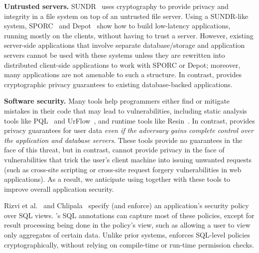 
{\bf Untrusted servers.}
SUNDR~\cite{li:sundr} uses cryptography to provide privacy and
integrity in a file system on top of an untrusted file server.  Using
a SUNDR-like system, SPORC~\cite{feldman:sporc} and
Depot~\cite{mahajan:depot} show how to build low-latency applications,
running mostly on the clients, without having to trust a server.
However, existing server-side applications that involve separate
database/storage and application servers cannot be used with these
systems unless they are rewritten into distributed client-side
applications to work with SPORC or Depot; moreover, many applications
are not amenable to such a structure.
In contrast, \name{} provides cryptographic privacy guarantees to
existing database-backed applications.



{\bf Software security.}  Many tools help programmers either find or
mitigate mistakes in their code that may lead to vulnerabilities,
including static analysis tools like PQL~\cite{livshits:javasec, martin:pql} and
UrFlow~\cite{chlipala:urflow}, and runtime tools like
Resin~\cite{yip:resin}.
In contrast, \name{} provides privacy guarantees for user data
\textit{even if the adversary gains complete control over the
  application and database servers}.  These tools provide no
guarantees in the face of this threat, but in contrast, \name cannot
provide privacy in the face of vulnerabilities that trick the user's
client machine into issuing unwanted requests (such as cross-site
scripting or cross-site request forgery vulnerabilities in web
applications).  As a result, we anticipate using \name{} together with
these tools to improve overall application security.

Rizvi et al.~\cite{rizvi:fine-grained} and
Chlipala~\cite{chlipala:urflow} specify (and enforce) an application's
security policy over SQL views.  \name{}'s SQL annotations can capture
most of these policies, except for result processing being done in the
policy's view, such as allowing a user to view only aggregates of
certain data.  Unlike prior systems, \name{} enforces SQL-level
policies cryptographically, without relying on compile-time or
run-time permission checks.


